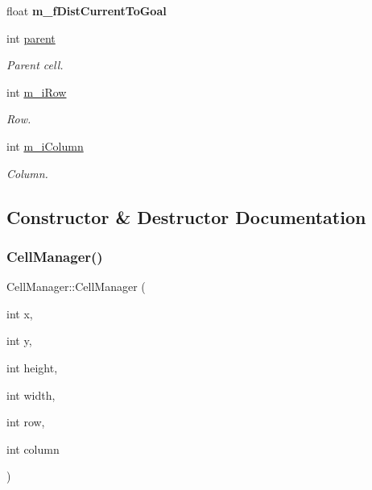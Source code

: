 \begin{DoxyCompactItemize}
\mbox{\label{class_cell_manager_ae515543daf0ae8d9838f8b481cd5ae05}} 
float {\bfseries m\+\_\+f\+Dist\+Current\+To\+Goal}
\item 
\mbox{\label{class_cell_manager_a6d3b28289ad1655a7447ce26bb2d4cf3}} 
int \mbox{\hyperlink{class_cell_manager_a6d3b28289ad1655a7447ce26bb2d4cf3}{parent}}
\begin{DoxyCompactList}\small\item\em Parent cell. \end{DoxyCompactList}\item 
\mbox{\label{class_cell_manager_a067eeb6e400cfd443b9375ec0dad0186}} 
int \mbox{\hyperlink{class_cell_manager_a067eeb6e400cfd443b9375ec0dad0186}{m\+\_\+i\+Row}}
\begin{DoxyCompactList}\small\item\em Row. \end{DoxyCompactList}\item 
\mbox{\label{class_cell_manager_a694ac6bd428aab0cff7355dda80468ad}} 
int \mbox{\hyperlink{class_cell_manager_a694ac6bd428aab0cff7355dda80468ad}{m\+\_\+i\+Column}}
\begin{DoxyCompactList}\small\item\em Column. \end{DoxyCompactList}\end{DoxyCompactItemize}


\subsection{Constructor \& Destructor Documentation}
\mbox{\label{class_cell_manager_aa0f293fc17a96f4622e5f9d3bec0928f}} 
\subsubsection{\texorpdfstring{Cell\+Manager()}{CellManager()}}
{\footnotesize\ttfamily Cell\+Manager\+::\+Cell\+Manager (\begin{DoxyParamCaption}\item[{int}]{x,  }\item[{int}]{y,  }\item[{int}]{height,  }\item[{int}]{width,  }\item[{int}]{row,  }\item[{int}]{column }\end{DoxyParamCaption})}



